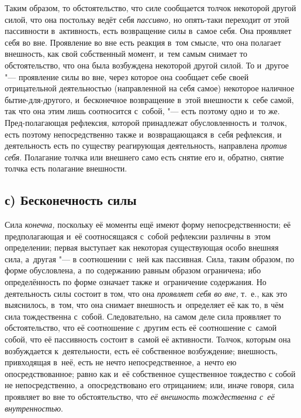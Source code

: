 Таким образом, то обстоятельство, что силе сообщается толчок некоторой
другой силой, что она постольку ведёт себя
{\em пассивно,} но опять-таки переходит от этой
пассивности в~активность, есть возвращение силы в~самое себя. Она проявляет
себя во вне. Проявление во вне есть реакция в~том смысле, что она полагает
внешность, как свой собственный момент, и~тем самым снимает то
обстоятельство, что она была возбуждена некоторой другой силой. То и~другое
"--- проявление силы во вне, через которое она сообщает себе своей
отрицательной деятельностью (направленной на себя самое) некоторое наличное
бытие-для-другого, и~бесконечное возвращение в~этой внешности к~себе самой,
так что она этим лишь соотносится с~собой, "--- есть поэтому одно и~то же.
Пред-полагающая рефлексия, которой принадлежат обусловленность и~толчок,
есть поэтому непосредственно также и~возвращающаяся в~себя рефлексия, и
деятельность есть по существу реагирующая деятельность, направлена
{\em против себя}. Полагание толчка или внешнего само
есть снятие его и, обратно, снятие толчка есть полагание внешности.


\subsection[с) Бесконечность силы]{с) Бесконечность силы}

Сила {\em конечна,}
поскольку её моменты ещё имеют форму непосредственности; её предполагающая
и~её соотносящаяся с~собой рефлексии различны в~этом определении; первая
выступает как некоторая существующая особо внешняя сила, а~другая "--- в
соотношении с~ней как пассивная. Сила, таким образом, по форме обусловлена,
а~по содержанию равным образом ограничена; ибо определённость по форме
означает также и~ограничение содержания. Но деятельность силы состоит в
том, что она {\em проявляет себя во вне,} т.~е., как
это выяснилось, в~том, что она снимает внешность и~определяет её как то, в
чём сила тождественна с~собой. Следовательно, на самом деле сила проявляет
то обстоятельство, что её соотношение с~другим есть её соотношение с~самой
собой, что её пассивность состоит в~самой её активности. Толчок, которым
она возбуждается к~деятельности, есть её собственное возбуждение;
внешность, привходящая в~неё, есть не нечто непосредственное, а~нечто ею
опосредствованное; равно как и~её собственное существенное тождество с
собой не непосредственно, а~опосредствовано его отрицанием; или, иначе
говоря, сила проявляет во вне то обстоятельство, что
{\em её внешность тождественна с~её внутренностью}.


